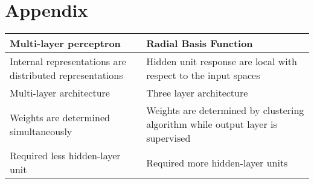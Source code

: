 \chapter{Appendix}

\begin{longtable}{ | P{6cm} | P{6cm} | } 
    \hline
    \textbf{Multi-layer perceptron} & \textbf{Radial Basis Function} \newline \\ \hline
    Internal representations are distributed representations \newline & 
    Hidden unit response are local with respect to the input spaces \newline \\ \hline
    
    Multi-layer architecture \newline & 
    Three layer architecture \newline  \\ \hline
    
    Weights are determined simultaneously\newline & 
    Weights are determined by clustering algorithm while output layer is supervised \newline \\ \hline
    
    Required less hidden-layer unit & 
    Required more hidden-layer units \newline \\ \hline
\end{longtable}